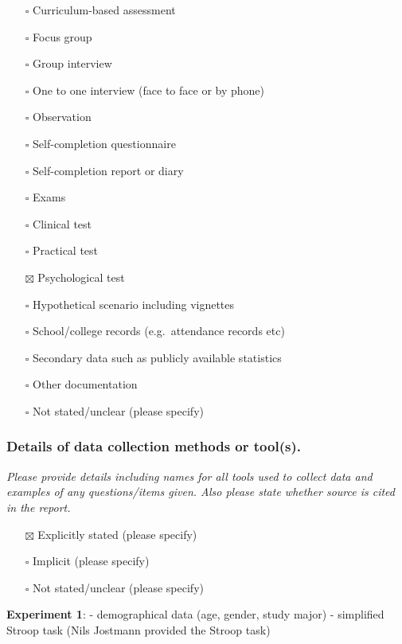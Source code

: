 \documentclass[
  doc, a4paper]{apa7}
\providecommand{\tightlist}{%
  \setlength{\itemsep}{0pt}\setlength{\parskip}{0pt}}
\begin{document}
\begin{itemize}
\tightlist
\item[$\square$]
  Curriculum-based assessment
\item[$\square$]
  Focus group
\item[$\square$]
  Group interview
\item[$\square$]
  One to one interview (face to face or by phone)
\item[$\square$]
  Observation
\item[$\square$]
  Self-completion questionnaire
\item[$\square$]
  Self-completion report or diary
\item[$\square$]
  Exams
\item[$\square$]
  Clinical test
\item[$\square$]
  Practical test
\item[$\boxtimes$]
  Psychological test
\item[$\square$]
  Hypothetical scenario including vignettes
\item[$\square$]
  School/college records (e.g.~attendance records etc)
\item[$\square$]
  Secondary data such as publicly available statistics
\item[$\square$]
  Other documentation
\item[$\square$]
  Not stated/unclear (please specify)
\end{itemize}

\subsubsection{Details of data collection methods or tool(s).}\label{details-of-data-collection-methods-or-tools.}

\emph{Please provide details including names for all tools used to collect data and examples of any questions/items given. Also please state whether source is cited in the report.}

\begin{itemize}
\tightlist
\item[$\boxtimes$]
  Explicitly stated (please specify)
\item[$\square$]
  Implicit (please specify)
\item[$\square$]
  Not stated/unclear (please specify)
\end{itemize}

\textbf{Experiment 1}:
- demographical data (age, gender, study major)
- simplified Stroop task (Nils Jostmann provided the Stroop task)
\end{document}
